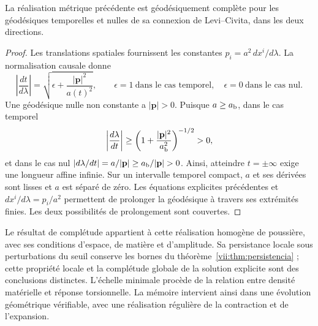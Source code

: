 \begin{proposition}
\label{vii:prop:completitud-causal-polvo}
La réalisation métrique précédente est géodésiquement complète
pour les géodésiques temporelles et nulles de sa connexion de
Levi--Civita, dans les deux directions.
\end{proposition}
\begin{proof}
Les translations spatiales fournissent les constantes \(p_i=a^2\,dx^i/d\lambda\). La normalisation causale donne
\[
 \left|\frac{dt}{d\lambda}\right|
 =\sqrt{\epsilon+\frac{|\mathbf p|^2}{a(t)^2}},
 \qquad \epsilon=1\ \text{dans le cas temporel},\quad
 \epsilon=0\ \text{dans le cas nul}.
\]
Une géodésique nulle non constante a \(|\mathbf p|>0\). Puisque \(a\geq a_{\rm b}\), dans le cas temporel
\[
 \left|\frac{d\lambda}{dt}\right|
 \geq\left(1+\frac{|\mathbf p|^2}{a_{\rm b}^2}\right)^{-1/2}>0,
\]
et dans le cas nul
\(\left|d\lambda/dt\right|=a/|\mathbf p|
 \geq a_{\rm b}/|\mathbf p|>0\).
Ainsi, atteindre \(t=\pm\infty\) exige une longueur affine infinie.
Sur un intervalle temporel compact, \(a\) et ses dérivées sont
lisses et \(a\) est séparé de zéro. Les équations explicites
précédentes et \(dx^i/d\lambda=p_i/a^2\) permettent de prolonger la
géodésique à travers ses extrémités finies. Les deux possibilités
de prolongement sont couvertes.
\end{proof}

Le résultat de complétude appartient à cette réalisation homogène de
poussière, avec ses conditions d'espace, de matière et d'amplitude. Sa
persistance locale sous perturbations du seuil conserve les bornes
du théorème~\ref{vii:thm:persistencia} ; cette propriété locale et la
complétude globale de la solution explicite sont des conclusions distinctes.
L'échelle minimale procède de la relation entre densité matérielle et
réponse torsionnelle. La mémoire intervient ainsi dans une évolution
géométrique vérifiable, avec une réalisation régulière de la contraction
et de l'expansion.
